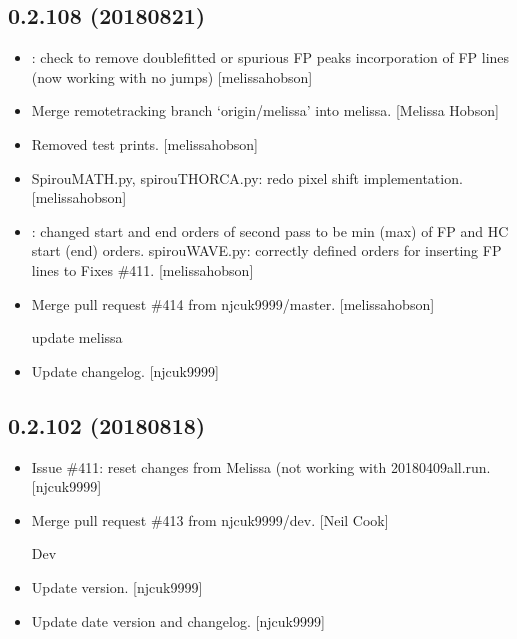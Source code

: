 \documentclass[a4paper,10pt,english]{report}
\begin{document}
\subsection{0.2.108 (2018\sphinxhyphen{}08\sphinxhyphen{}21)}
\label{\detokenize{misc/changelog:id378}}\begin{itemize}
\item {} 
: \sphinxhyphen{} check to remove double\sphinxhyphen{}fitted or
spurious FP peaks \sphinxhyphen{} incorporation of FP lines (now working with no
jumps) {[}melissa\sphinxhyphen{}hobson{]}

\item {} 
Merge remote\sphinxhyphen{}tracking branch ‘origin/melissa’ into melissa. {[}Melissa
Hobson{]}

\item {} 
Removed test prints. {[}melissa\sphinxhyphen{}hobson{]}

\item {} 
SpirouMATH.py, spirouTHORCA.py: redo pixel shift implementation.
{[}melissa\sphinxhyphen{}hobson{]}

\item {} 
: changed start and end orders of second pass to
be min (max) of FP and HC start (end) orders. spirouWAVE.py: correctly
defined orders for inserting FP lines to  Fixes \#411.
{[}melissa\sphinxhyphen{}hobson{]}

\item {} 
Merge pull request \#414 from njcuk9999/master. {[}melissa\sphinxhyphen{}hobson{]}

update melissa

\item {} 
Update changelog. {[}njcuk9999{]}

\end{itemize}


\subsection{0.2.102 (2018\sphinxhyphen{}08\sphinxhyphen{}18)}
\label{\detokenize{misc/changelog:id379}}\begin{itemize}
\item {} 
Issue \#411: reset  changes from Melissa (not working with
 20180409all.run. {[}njcuk9999{]}

\item {} 
Merge pull request \#413 from njcuk9999/dev. {[}Neil Cook{]}

Dev

\item {} 
Update version. {[}njcuk9999{]}

\item {} 
Update date version and changelog. {[}njcuk9999{]}

\end{itemize}
\end{document}
